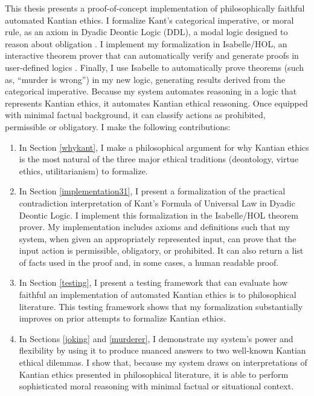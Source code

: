 \begin{isabellebody}
\begin{isamarkuptext}
This thesis presents a proof-of-concept implementation of philosophically faithful automated Kantian ethics. 
I formalize Kant's categorical imperative, or moral rule, as an axiom 
in Dyadic Deontic Logic (DDL), a modal logic designed to reason about 
obligation \citep{CJDDL}. I implement my formalization in Isabelle/HOL, an interactive theorem prover 
that can automatically verify and generate proofs in user-defined logics \citep{isabelle}. Finally, 
I use Isabelle to automatically prove theorems (such as, ``murder is wrong'') in my new logic, 
generating results derived from the categorical imperative. Because my system automates reasoning in 
a logic that represents Kantian ethics, it automates Kantian ethical reasoning. Once equipped with 
minimal factual background, it can classify actions as prohibited, permissible or obligatory. I 
make the following contributions:%
\end{isamarkuptext}\isamarkuptrue%
%
\begin{isamarkuptext}%
\begin{enumerate}
\item In Section \ref{whykant}, I make a philosophical argument for why Kantian ethics is the most natural of the three major
ethical traditions (deontology, virtue ethics, utilitarianism) to formalize.

\item In Section \ref{implementation31}, I present a formalization of the practical contradiction interpretation of Kant's 
Formula of Universal Law in Dyadic Deontic Logic. I implement this formalization in the Isabelle/HOL
theorem prover. My implementation includes axioms and definitions such that my system, when given an appropriately
represented input, can prove that the input action is permissible, obligatory, or prohibited. It can also return
a list of facts used in the proof and, in some cases, a human readable proof. 

\item In Section \ref{testing}, I present a testing framework that can evaluate how faithful an implementation 
of automated Kantian ethics is to philosophical literature. This testing framework shows that 
my formalization substantially improves on prior attempts to formalize Kantian ethics. 

\item In Sections \ref{joking} and \ref{murderer}, I demonstrate my system's power and flexibility by 
using it to produce nuanced answers to two well-known Kantian ethical dilemmas. I show that, because 
my system draws on interpretations of Kantian ethics presented in philosophical literature, it is able 
to perform sophisticated moral reasoning with minimal factual or situational context. 


\end{enumerate}
\end{isamarkuptext}
\end{isabellebody}

